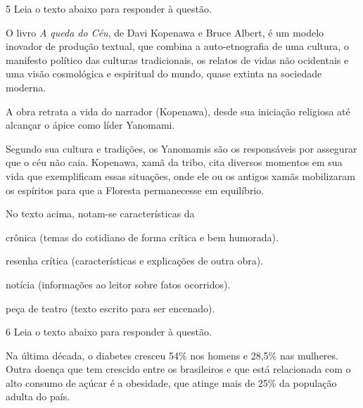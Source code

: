 \num{5} Leia o texto abaixo para responder à questão. 

\begin{myquote}

O livro \textit{A queda do Céu}, de Davi Kopenawa e Bruce Albert, é um modelo
inovador de produção textual, que combina a auto-etnografia de uma
cultura, o manifesto político das culturas tradicionais, os relatos de
vidas não ocidentais e uma visão cosmológica e espiritual do mundo,
quase extinta na sociedade moderna.

A obra retrata a vida do narrador (Kopenawa), desde sua iniciação
religiosa até alcançar o ápice como líder Yanomami.

Segundo sua cultura e tradições, os Yanomamis são os responsáveis por
assegurar que o céu não caia. Kopenawa, xamã da tribo, cita diversos
momentos em sua vida que exemplificam essas situações, onde ele ou os
antigos xamãs mobilizaram os espíritos para que a Floresta permanecesse
em equilíbrio.


\end{myquote}


No texto acima, notam-se características da

\begin{escolha}

    \item crônica (temas do cotidiano de forma crítica e bem humorada).

    \item resenha crítica (características e explicações de outra obra).

    \item notícia (informações ao leitor sobre fatos ocorridos).

    \item peça de teatro (texto escrito para ser encenado). 

\end{escolha}

\num{6} Leia o texto abaixo para responder à questão. 

\begin{myquote}

Na última década, o diabetes cresceu 54\% nos homens e 28,5\% nas
mulheres. Outra doença que tem crescido entre os brasileiros e que está
relacionada com o alto consumo de açúcar é a obesidade, que atinge
mais de 25\% da população adulta do país.


\end{myquote}

